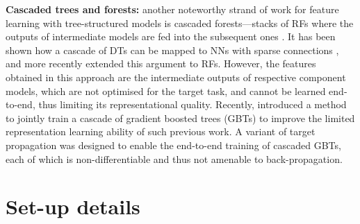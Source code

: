 \textbf{Cascaded trees and forests:} another noteworthy strand of work for feature learning with tree-structured models is cascaded forests---stacks of RFs where the outputs of intermediate models are fed into the subsequent ones \citep{montillo2011entangled,kontschieder2013geof,zhou2017deepft}. It has been shown how a cascade of DTs can be mapped to NNs with sparse connections \citep{sethi1990entropy}, and more recently \citet{richmond2015mapping} extended this argument to RFs. However, the features obtained in this approach are the intermediate outputs of respective component models, which are not optimised for the target task, and cannot be learned end-to-end, thus limiting its representational quality. Recently, \citet{feng2018multi} introduced a method to jointly train a cascade of gradient boosted trees (GBTs) to improve the limited representation learning ability of such previous work. A variant of target propagation \cite{lee2015difference} was designed to enable the end-to-end training of cascaded GBTs, each of which is non-differentiable and thus not amenable to back-propagation. 




\section{Set-up details}\label{sec:supp_train_details}
\vspace{-2mm}
